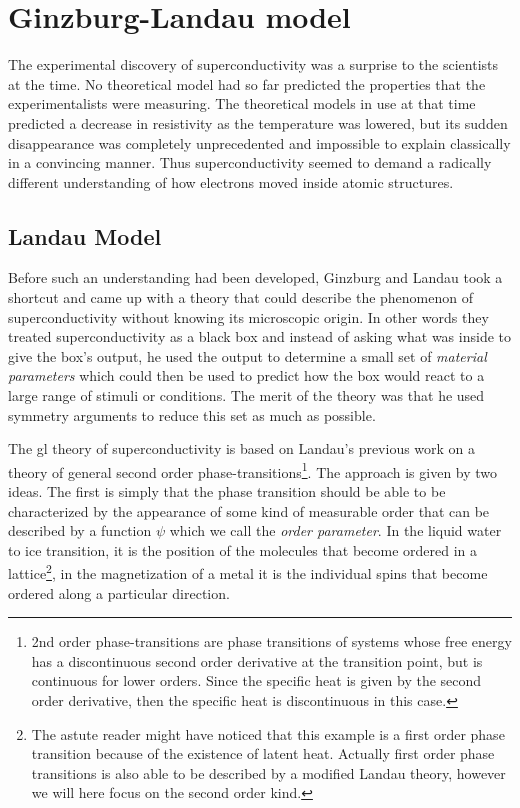 \section{Ginzburg-Landau model}

The experimental discovery of superconductivity was a surprise to the scientists at the time. No theoretical model
had so far predicted the properties that the experimentalists were measuring. The theoretical models in use at that
time predicted a decrease in resistivity as the temperature was lowered, but its sudden disappearance was completely
unprecedented and impossible to explain classically in a convincing manner. Thus superconductivity seemed to demand
a radically different understanding of how electrons moved inside atomic structures.

\subsection{Landau Model}

Before such an understanding had been developed, Ginzburg and Landau took a shortcut and came up with a theory
that could describe the phenomenon of superconductivity without knowing its microscopic origin. In other words
they treated superconductivity as a black box and instead of asking what was inside to give the box's output,
he used the output to determine a small set of \emph{material parameters} which could then be used to predict
how the box would react to a large range of stimuli or conditions. The merit of the theory was that
he used symmetry arguments to reduce this set as much as possible.

The \ac{gl} theory of superconductivity is based on Landau's previous work on a theory of general second
order phase-transitions\footnote{2nd order phase-transitions are phase transitions of systems whose free energy
has a discontinuous second order derivative at the transition point, but is continuous for lower orders.
Since the specific heat is given by the second order derivative, then the specific heat is discontinuous in this case.}.
The approach is given by two ideas. The first is simply that the phase transition should be able to be characterized
by the appearance of some kind of measurable
order that can be described by a function $\psi$ which we call the \emph{order parameter}. In the liquid water to ice transition,
it is the position of the molecules that become ordered in a lattice\footnote{The astute reader might have noticed that this
example is a first order phase transition because of the existence of latent heat. Actually first order phase transitions
is also able to be described by a modified Landau theory, however we will here focus on the second order kind.},
in the magnetization of a metal it is the individual spins that become ordered along a particular direction.

